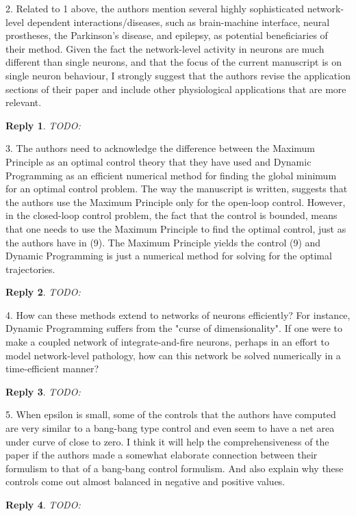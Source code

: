 \documentclass{article}
\newtheorem*{rep}{Reply}
\begin{document}
2. Related to 1 above, the authors mention several highly sophisticated
network-level dependent interactions/diseases, such as brain-machine interface,
neural prostheses, the Parkinson's disease, and epilepsy, as potential
beneficiaries of their method. Given the fact the network-level activity in
neurons are much different than single neurons, and that the focus of the
current manuscript is on single neuron behaviour, I strongly suggest that the
authors revise the application sections of their paper and include other
physiological applications that are more relevant.
\begin{rep}
TODO:
\end{rep}
3. The authors need to acknowledge the difference between the Maximum Principle
as an optimal control theory that they have used and Dynamic Programming as an
efficient numerical method for finding the global minimum for an optimal control
problem. The way the manuscript is written, suggests that the authors use the
Maximum Principle only for the open-loop control. However, in the closed-loop
control problem, the fact that the control is bounded, means that one needs to
use the Maximum Principle to find the optimal control, just as the authors have
in (9). The Maximum Principle yields the control (9) and Dynamic Programming is
just a numerical method for solving for the optimal trajectories.
\begin{rep}
TODO:
\end{rep}

4. How can these methods extend to networks of neurons efficiently? For
instance, Dynamic Programming suffers from the "curse of dimensionality". If one
were to make a coupled network of integrate-and-fire neurons, perhaps in an
effort to model network-level pathology, how can this network be solved
numerically in a time-efficient manner?
\begin{rep}
TODO:
\end{rep}

5. When epsilon is small, some of the controls that the authors have computed
are very similar to a bang-bang type control and even seem to have a net area
under curve of close to zero. I think it will help the comprehensiveness of the
paper if the authors made a somewhat elaborate connection between their
formulism to that of a bang-bang control formulism. And also explain why these
controls come out almost balanced in negative and positive values.
\begin{rep}
TODO:
\end{rep}
\end{document}
